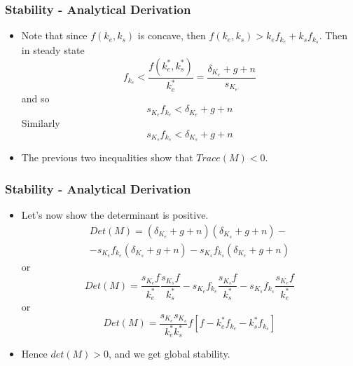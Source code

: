 \documentclass[11pt]{beamer}
\begin{document}

\begin{frame}
\frametitle{Stability - Analytical Derivation}
\begin{itemize}\itemsep2ex
	\item Note that since $f(k_e, k_s)$ is concave, then $f(k_e, k_s)>k_e f_{k_e} + 	k_s f_{k_s}$. Then in steady state
\begin{equation*}
f_{k_e} < \frac{f(k_e^*, k_s^*)}{k_e^*} =  \frac{\delta_{K_e} + g + n}{s_{K_e}}
\end{equation*}
 and so
\begin{equation*}
s_{K_e}f_{k_e} < \delta_{K_e} + g + n
\end{equation*}
Similarly
\begin{equation*}
s_{K_s}f_{k_s} < \delta_{K_s} + g + n
\end{equation*}
	\item The previous two inequalities show that $Trace(M)<0$.
\end{itemize}
\end{frame}


\begin{frame}
\frametitle{Stability - Analytical Derivation}
\begin{itemize}\itemsep2ex
	\item Let's now show the determinant is positive.
\begin{multline*}
Det(M) = ( \delta_{K_e} + g + n) ( \delta_{K_s} + g + n) - \\ - s_{K_e}f_{k_e}( \delta_{K_s} + g + n) - s_{K_s}f_{k_s} ( \delta_{K_e} + g + n)
\end{multline*}
or
\begin{equation*}
Det(M) = \frac{s_{K_e} f}{k_e^*} \frac{s_{K_s} f}{k_s^*} -  s_{K_e}f_{k_e}\frac{s_{K_s} f}{k_s^*} - s_{K_s}f_{k_s} \frac{s_{K_e} f}{k_e^*}
\end{equation*}
or
\begin{equation*}
Det(M) = \frac{s_{K_e} s_{K_s}}{k_e^* k_s^*}f [ f - k_e^* f_{k_e} - k_s^* f_{k_s} ]
\end{equation*}
	\item Hence $det(M)>0$, and we get global stability.
\end{itemize}
\end{frame}




































\end{document}
